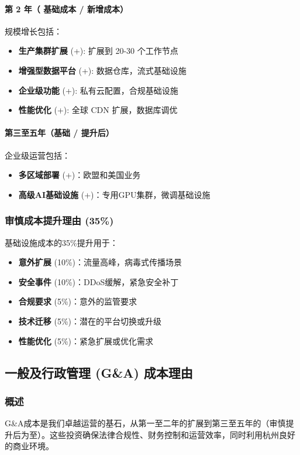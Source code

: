 \documentclass[11点, A4纸, 单面]{article}
\begin{document}
\paragraph{第 2 年（ 基础成本 /  新增成本）}
规模增长包括：
\begin{itemize}
    \item \textbf{生产集群扩展} (+): 扩展到 20-30 个工作节点
    \item \textbf{增强型数据平台} (+): 数据仓库，流式基础设施
    \item \textbf{企业级功能} (+): 私有云配置，合规基础设施
    \item \textbf{性能优化} (+): 全球 CDN 扩展，数据库调优
\end{itemize}

\paragraph{第三至五年（基础 / 提升后）}
企业级运营包括：
\begin{itemize}
    \item \textbf{多区域部署} (+)：欧盟和美国业务
    \item \textbf{高级AI基础设施} (+)：专用GPU集群，微调基础设施
\end{itemize}

\subsubsection{审慎成本提升理由 (35\%)}
基础设施成本的35\%提升用于：
\begin{itemize}
    \item \textbf{意外扩展} (10\%)：流量高峰，病毒式传播场景
    \item \textbf{安全事件} (10\%)：DDoS缓解，紧急安全补丁
    \item \textbf{合规要求} (5\%)：意外的监管要求
    \item \textbf{技术迁移} (5\%)：潜在的平台切换或升级
    \item \textbf{性能优化} (5\%)：紧急扩展或优化需求
\end{itemize}

\subsection{一般及行政管理 (G\&A) 成本理由}

\subsubsection{概述}
G\&A成本是我们卓越运营的基石，从第一至二年的扩展到第三至五年的（审慎提升后为至）。这些投资确保法律合规性、财务控制和运营效率，同时利用杭州良好的商业环境。
\end{document}
